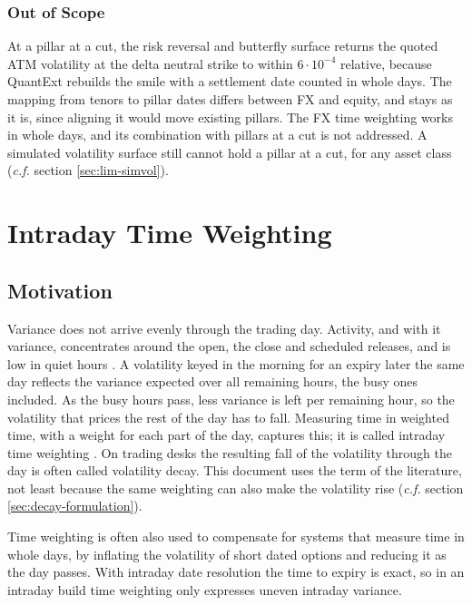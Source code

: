 \documentclass[12pt, a4paper]{article}
\begin{document}
\subsubsection*{Out of Scope}

At a pillar at a cut, the risk reversal and butterfly surface returns the quoted ATM volatility at the delta neutral
strike to within $6\cdot 10^{-4}$ relative, because QuantExt rebuilds the smile with a settlement date counted in whole
days. The mapping from tenors to pillar dates differs between FX and equity, and stays as it is, since aligning it would
move existing pillars. The FX time weighting works in whole days, and its combination with pillars at a cut is not
addressed. A simulated volatility surface still cannot hold a pillar at a cut, for any asset class (\textit{c.f.} section
\ref{sec:lim-simvol}).

\section{Intraday Time Weighting}\label{sec:decay}

\subsection{Motivation}

Variance does not arrive evenly through the trading day. Activity, and with it variance, concentrates around the open,
the close and scheduled releases, and is low in quiet hours \cite{andersen1997, andersen1998}. A volatility keyed in the morning for an expiry later the
same day reflects the variance expected over all remaining hours, the busy ones included. As the busy hours pass, less
variance is left per remaining hour, so the volatility that prices the rest of the day has to fall. Measuring time in
weighted time, with a weight for each part of the day, captures this; it is called intraday time weighting
\cite{clark2011}. On trading desks the resulting fall of the volatility through the day is often called volatility
decay. This document uses the term of the literature, not least because the same weighting can also make the
volatility rise (\textit{c.f.} section \ref{sec:decay-formulation}).

Time weighting is often also used to compensate for systems that measure time in whole days, by inflating the volatility of
short dated options and reducing it as the day passes. With intraday date resolution the time to expiry is exact, so
in an intraday build time weighting only expresses uneven intraday variance.
\end{document}
